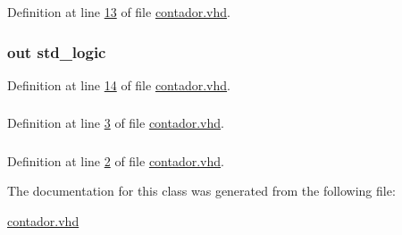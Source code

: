 Definition at line \hyperlink{contador_8vhd_source_l00013}{13} of file \hyperlink{contador_8vhd_source}{contador.\+vhd}.

\hypertarget{classcontador_aae281cf725515894f893258c629a59c7}{}
\subsubsection[{sinc}]{ {\bfseries \textcolor{keywordflow}{out}\textcolor{vhdlchar}{ }} {\bfseries \textcolor{comment}{std\+\_\+logic}\textcolor{vhdlchar}{ }} \hspace{0.3cm}{\ttfamily [Port]}}\label{classcontador_aae281cf725515894f893258c629a59c7}


Definition at line \hyperlink{contador_8vhd_source_l00014}{14} of file \hyperlink{contador_8vhd_source}{contador.\+vhd}.

\hypertarget{classcontador_aa4b2b25246a821511120e3149b003563}{}
\subsubsection[{S\+T\+D\+\_\+\+L\+O\+G\+I\+C\+\_\+1164}]{\hspace{0.3cm}{\ttfamily [Package]}}\label{classcontador_aa4b2b25246a821511120e3149b003563}


Definition at line \hyperlink{contador_8vhd_source_l00003}{3} of file \hyperlink{contador_8vhd_source}{contador.\+vhd}.

\hypertarget{classcontador_a241c3e72dd8024cc8ae831b1b2aed7db}{}
\subsubsection[{S\+T\+D\+\_\+\+L\+O\+G\+I\+C\+\_\+\+U\+N\+S\+I\+G\+N\+E\+D}]{\hspace{0.3cm}{\ttfamily [Package]}}\label{classcontador_a241c3e72dd8024cc8ae831b1b2aed7db}


Definition at line \hyperlink{contador_8vhd_source_l00002}{2} of file \hyperlink{contador_8vhd_source}{contador.\+vhd}.



The documentation for this class was generated from the following file\+:\begin{DoxyCompactItemize}
\item 
\hyperlink{contador_8vhd}{contador.\+vhd}\end{DoxyCompactItemize}
